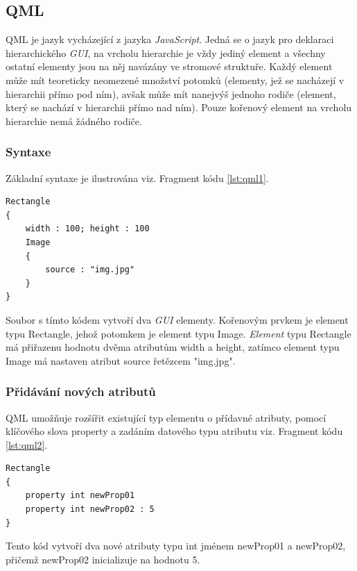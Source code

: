 \documentclass[11pt,twoside,a4paper]{book}
\begin{document}
{{\begin{ttemize}
{{\subsection{QML}
QML je jazyk vycházející z jazyka \textit{JavaScript}. Jedná se o jazyk pro deklaraci hierarchického \textit{GUI}, na vrcholu hierarchie je vždy jediný element a všechny ostatní elementy jsou na něj navázány ve stromové struktuře. Každý element může mít teoreticky neomezené množství potomků (elementy, jež se nacházejí v hierarchii přímo pod ním), avšak může mít nanejvýš jednoho rodiče (element, který se nachází v hierarchii přímo nad ním). Pouze kořenový element na vrcholu hierarchie nemá žádného rodiče.

\subsubsection{Syntaxe}
Základní syntaxe je ilustrována viz. Fragment kódu \ref{lst:qml1}.
\begin{lstlisting}[frame=single,caption=Tvorba dvou jednoduchých elementů pomocí jazyka \textit{QML}.,label=Tvorba dvou jednoduchých elementů pomocí jazyka \textit{QML}.,label=lst:qml1]
Rectangle
{
	width : 100; height : 100
	Image
	{
		source : "img.jpg"
	}
}
\end{lstlisting}
Soubor s tímto kódem vytvoří dva \textit{GUI} elementy. Kořenovým prvkem je element typu Rectangle, jehož potomkem je element typu Image. \textit{Element} typu Rectangle má přiřazenu hodnotu dvěma atributům width a height, zatímco element typu Image má nastaven atribut source řetězcem "img.jpg".

\subsubsection{Přidávání nových atributů}
QML umožňuje rozšířit existující typ elementu o přídavné atributy, pomocí klíčového slova property a zadáním  datového typu atributu viz. Fragment kódu \ref{lst:qml2}.
\begin{lstlisting}[frame=single,caption=Ukázka deklarace dvou nových atributů.,label=lst:qml2]
Rectangle
{
	property int newProp01
	property int newProp02 : 5
}
\end{lstlisting}
Tento kód vytvoří dva nové atributy typu int jménem newProp01 a newProp02, přičemž newProp02 inicializuje na hodnotu 5.
}}
\end{ttemize}}}
\end{document}
